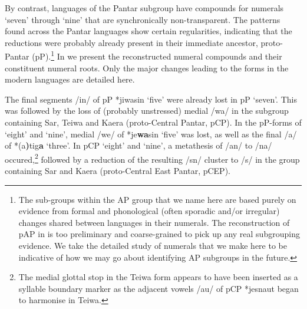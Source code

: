 \let\eachwordone=\it
\let\eachwordtwo=\rm
\let\eachwordthree=\rm
\let\eachwordfour=\rm
\let\eachwordfive=\rm
\let\eachwordsix=\rm
\let\eachwordseven=\rm

By contrast, languages of the Pantar subgroup have compounds for numerals `seven' through `nine' that are synchronically non-transparent. The patterns found across the Pantar languages show certain regularities, indicating that the reductions were probably already present in their immediate ancestor, proto-Pantar (pP).\footnote{The sub-groups within the AP group that we name here are based purely on evidence from formal and phonological (often sporadic and/or irregular) changes shared between languages in their numerals. The reconstruction of pAP in \citet{HoltonEtAl2012} is too preliminary and coarse-grained to pick up any real subgrouping evidence. We take the detailed study of numerals that we make here to be indicative of how we may go about identifying AP subgroups in the future.}  In  we present the reconstructed numeral compounds and their constituent numeral roots. Only the major changes leading to the forms in the modern languages are detailed here. 

  The final segments /in/ of pP *jiwasin `five' were already lost in pP `seven'. This was followed by the loss of (probably unstressed) medial /wa/ in the subgroup containing Sar, Teiwa and Kaera (proto-Central Pantar, pCP). In the pP-forms of `eight' and `nine', medial /we/ of *je\textbf{wa}sin `five' was lost, as well as the final /a/ of *(a\textbf{)}tig\textbf{a} `three'. In pCP `eight' and `nine', a metathesis of /an/ to /na/ occured,\footnote{The medial glottal stop in the Teiwa form appears to have been inserted as a syllable boundary marker as the adjacent vowels /au/ of pCP *jesnaut began to harmonise in Teiwa.}  followed by a reduction of the resulting /sn/ cluster to /s/ in the group containing Sar and Kaera (proto-Central East Pantar, pCEP). 



